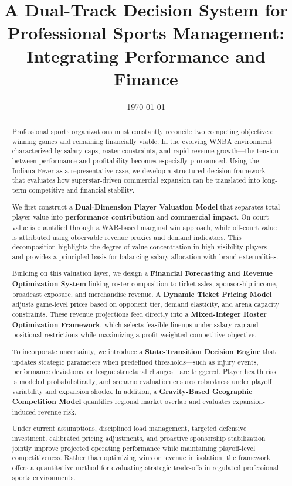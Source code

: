 \documentclass{mcmthesis}
\title{A Dual-Track Decision System for Professional Sports Management: Integrating Performance and Finance}
\date{\today}
\begin{document}
\begin{abstract}
Professional sports organizations must constantly reconcile two competing objectives: winning games and remaining financially viable. In the evolving WNBA environment—characterized by salary caps, roster constraints, and rapid revenue growth—the tension between performance and profitability becomes especially pronounced. Using the Indiana Fever as a representative case, we develop a structured decision framework that evaluates how superstar-driven commercial expansion can be translated into long-term competitive and financial stability.

We first construct a \textbf{Dual-Dimension Player Valuation Model} that separates total player value into \textbf{performance contribution} and \textbf{commercial impact}. On-court value is quantified through a WAR-based marginal win approach, while off-court value is attributed using observable revenue proxies and demand indicators. This decomposition highlights the degree of value concentration in high-visibility players and provides a principled basis for balancing salary allocation with brand externalities.

Building on this valuation layer, we design a \textbf{Financial Forecasting and Revenue Optimization System} linking roster composition to ticket sales, sponsorship income, broadcast exposure, and merchandise revenue. A \textbf{Dynamic Ticket Pricing Model} adjusts game-level prices based on opponent tier, demand elasticity, and arena capacity constraints. These revenue projections feed directly into a \textbf{Mixed-Integer Roster Optimization Framework}, which selects feasible lineups under salary cap and positional restrictions while maximizing a profit-weighted competitive objective.

To incorporate uncertainty, we introduce a \textbf{State-Transition Decision Engine} that updates strategic parameters when predefined thresholds—such as injury events, performance deviations, or league structural changes—are triggered. Player health risk is modeled probabilistically, and scenario evaluation ensures robustness under playoff variability and expansion shocks. In addition, a \textbf{Gravity-Based Geographic Competition Model} quantifies regional market overlap and evaluates expansion-induced revenue risk.

Under current assumptions, disciplined load management, targeted defensive investment, calibrated pricing adjustments, and proactive sponsorship stabilization jointly improve projected operating performance while maintaining playoff-level competitiveness. Rather than optimizing wins or revenue in isolation, the framework offers a quantitative method for evaluating strategic trade-offs in regulated professional sports environments.


\end{abstract}
\end{document}
